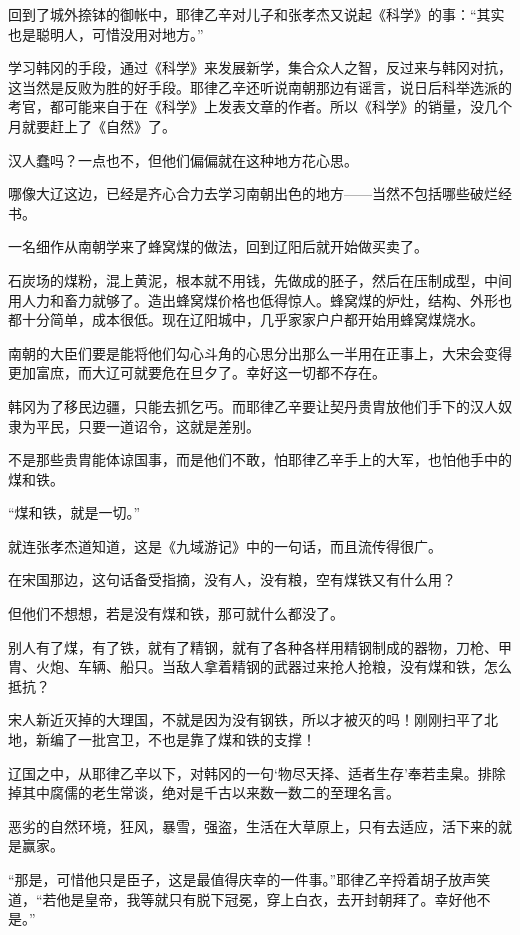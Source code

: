 回到了城外捺钵的御帐中，耶律乙辛对儿子和张孝杰又说起《科学》的事：“其实也是聪明人，可惜没用对地方。”

学习韩冈的手段，通过《科学》来发展新学，集合众人之智，反过来与韩冈对抗，这当然是反败为胜的好手段。耶律乙辛还听说南朝那边有谣言，说日后科举选派的考官，都可能来自于在《科学》上发表文章的作者。所以《科学》的销量，没几个月就要赶上了《自然》了。

汉人蠢吗？一点也不，但他们偏偏就在这种地方花心思。

哪像大辽这边，已经是齐心合力去学习南朝出色的地方——当然不包括哪些破烂经书。

一名细作从南朝学来了蜂窝煤的做法，回到辽阳后就开始做买卖了。

石炭场的煤粉，混上黄泥，根本就不用钱，先做成的胚子，然后在压制成型，中间用人力和畜力就够了。造出蜂窝煤价格也低得惊人。蜂窝煤的炉灶，结构、外形也都十分简单，成本很低。现在辽阳城中，几乎家家户户都开始用蜂窝煤烧水。

南朝的大臣们要是能将他们勾心斗角的心思分出那么一半用在正事上，大宋会变得更加富庶，而大辽可就要危在旦夕了。幸好这一切都不存在。

韩冈为了移民边疆，只能去抓乞丐。而耶律乙辛要让契丹贵胄放他们手下的汉人奴隶为平民，只要一道诏令，这就是差别。

不是那些贵胄能体谅国事，而是他们不敢，怕耶律乙辛手上的大军，也怕他手中的煤和铁。

“煤和铁，就是一切。”

就连张孝杰道知道，这是《九域游记》中的一句话，而且流传得很广。

在宋国那边，这句话备受指摘，没有人，没有粮，空有煤铁又有什么用？

但他们不想想，若是没有煤和铁，那可就什么都没了。

别人有了煤，有了铁，就有了精钢，就有了各种各样用精钢制成的器物，刀枪、甲胄、火炮、车辆、船只。当敌人拿着精钢的武器过来抢人抢粮，没有煤和铁，怎么抵抗？

宋人新近灭掉的大理国，不就是因为没有钢铁，所以才被灭的吗！刚刚扫平了北地，新编了一批宫卫，不也是靠了煤和铁的支撑！

辽国之中，从耶律乙辛以下，对韩冈的一句‘物尽天择、适者生存’奉若圭臬。排除掉其中腐儒的老生常谈，绝对是千古以来数一数二的至理名言。

恶劣的自然环境，狂风，暴雪，强盗，生活在大草原上，只有去适应，活下来的就是赢家。

“那是，可惜他只是臣子，这是最值得庆幸的一件事。”耶律乙辛捋着胡子放声笑道，“若他是皇帝，我等就只有脱下冠冕，穿上白衣，去开封朝拜了。幸好他不是。”

